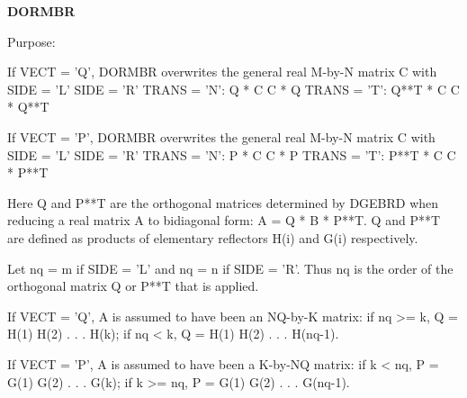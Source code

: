 {\bfseries D\+O\+R\+M\+B\+R} 

 \begin{DoxyParagraph}{Purpose\+: }
\begin{DoxyVerb} If VECT = 'Q', DORMBR overwrites the general real M-by-N matrix C
 with
                 SIDE = 'L'     SIDE = 'R'
 TRANS = 'N':      Q * C          C * Q
 TRANS = 'T':      Q**T * C       C * Q**T

 If VECT = 'P', DORMBR overwrites the general real M-by-N matrix C
 with
                 SIDE = 'L'     SIDE = 'R'
 TRANS = 'N':      P * C          C * P
 TRANS = 'T':      P**T * C       C * P**T

 Here Q and P**T are the orthogonal matrices determined by DGEBRD when
 reducing a real matrix A to bidiagonal form: A = Q * B * P**T. Q and
 P**T are defined as products of elementary reflectors H(i) and G(i)
 respectively.

 Let nq = m if SIDE = 'L' and nq = n if SIDE = 'R'. Thus nq is the
 order of the orthogonal matrix Q or P**T that is applied.

 If VECT = 'Q', A is assumed to have been an NQ-by-K matrix:
 if nq >= k, Q = H(1) H(2) . . . H(k);
 if nq < k, Q = H(1) H(2) . . . H(nq-1).

 If VECT = 'P', A is assumed to have been a K-by-NQ matrix:
 if k < nq, P = G(1) G(2) . . . G(k);
 if k >= nq, P = G(1) G(2) . . . G(nq-1).\end{DoxyVerb}
 
\end{DoxyParagraph}

